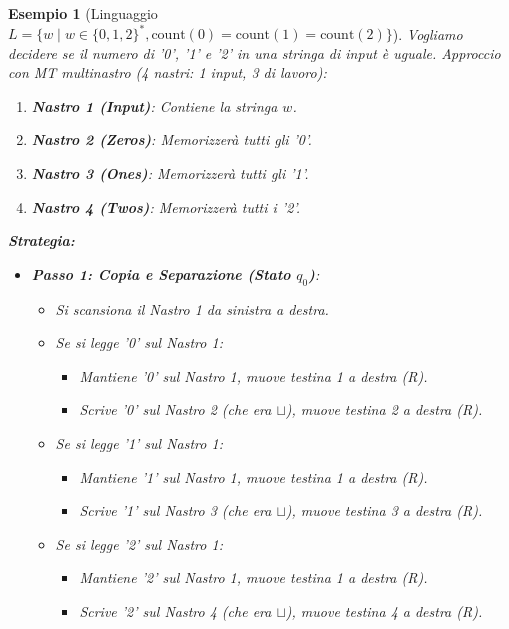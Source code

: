 \documentclass[a4paper, 11pt]{book} %
\newtheorem{example}[theorem]{Esempio}
\theoremstyle{definition}
\begin{document}
\begin{example}[Linguaggio $L = \{w \mid w \in \{0,1,2\}^*, \text{count}(0)=\text{count}(1)=\text{count}(2)\}$]
Vogliamo decidere se il numero di '0', '1' e '2' in una stringa di input è uguale.
Approccio con MT multinastro (4 nastri: 1 input, 3 di lavoro):
\begin{enumerate}
    \item \textbf{Nastro 1 (Input)}: Contiene la stringa $w$.
    \item \textbf{Nastro 2 (Zeros)}: Memorizzerà tutti gli '0'.
    \item \textbf{Nastro 3 (Ones)}: Memorizzerà tutti gli '1'.
    \item \textbf{Nastro 4 (Twos)}: Memorizzerà tutti i '2'.
\end{enumerate}
\textbf{Strategia:}
\begin{itemize}
    \item \textbf{Passo 1: Copia e Separazione (Stato $q_0$)}:
        \begin{itemize}
            \item Si scansiona il Nastro 1 da sinistra a destra.
            \item Se si legge '0' sul Nastro 1:
                \begin{itemize}
                    \item Mantiene '0' sul Nastro 1, muove testina 1 a destra (R).
                    \item Scrive '0' sul Nastro 2 (che era $\sqcup$), muove testina 2 a destra (R).
                \end{itemize}
            \item Se si legge '1' sul Nastro 1:
                \begin{itemize}
                    \item Mantiene '1' sul Nastro 1, muove testina 1 a destra (R).
                    \item Scrive '1' sul Nastro 3 (che era $\sqcup$), muove testina 3 a destra (R).
                \end{itemize}
            \item Se si legge '2' sul Nastro 1:
                \begin{itemize}
                    \item Mantiene '2' sul Nastro 1, muove testina 1 a destra (R).
                    \item Scrive '2' sul Nastro 4 (che era $\sqcup$), muove testina 4 a destra (R).
                \end{itemize}

\end{itemize}
\end{itemize}
\end{example}
\end{document}
